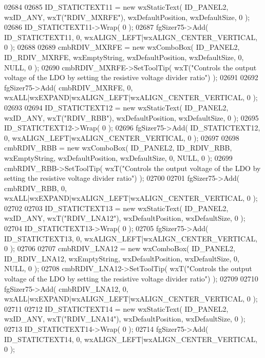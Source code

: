\begin{DoxyCode}
02684     
02685     ID_STATICTEXT11 = \textcolor{keyword}{new} wxStaticText( ID_PANEL2, wxID\_ANY, wxT(\textcolor{stringliteral}{"RDIV\_MXRFE"}), wxDefaultPosition, 
      wxDefaultSize, 0 );
02686     ID_STATICTEXT11->Wrap( 0 );
02687     fgSizer75->Add( ID_STATICTEXT11, 0, wxALIGN\_LEFT|wxALIGN\_CENTER\_VERTICAL, 0 );
02688     
02689     cmbRDIV_MXRFE = \textcolor{keyword}{new} wxComboBox( ID_PANEL2, ID_RDIV_MXRFE, wxEmptyString, wxDefaultPosition, 
      wxDefaultSize, 0, NULL, 0 ); 
02690     cmbRDIV_MXRFE->SetToolTip( wxT(\textcolor{stringliteral}{"Controls the output voltage of the LDO by setting the resistive voltage
       divider ratio"}) );
02691     
02692     fgSizer75->Add( cmbRDIV_MXRFE, 0, wxALL|wxEXPAND|wxALIGN\_LEFT|wxALIGN\_CENTER\_VERTICAL, 0 );
02693     
02694     ID_STATICTEXT12 = \textcolor{keyword}{new} wxStaticText( ID_PANEL2, wxID\_ANY, wxT(\textcolor{stringliteral}{"RDIV\_RBB"}), wxDefaultPosition, 
      wxDefaultSize, 0 );
02695     ID_STATICTEXT12->Wrap( 0 );
02696     fgSizer75->Add( ID_STATICTEXT12, 0, wxALIGN\_LEFT|wxALIGN\_CENTER\_VERTICAL, 0 );
02697     
02698     cmbRDIV_RBB = \textcolor{keyword}{new} wxComboBox( ID_PANEL2, ID_RDIV_RBB, wxEmptyString, wxDefaultPosition, wxDefaultSize, 
      0, NULL, 0 ); 
02699     cmbRDIV_RBB->SetToolTip( wxT(\textcolor{stringliteral}{"Controls the output voltage of the LDO by setting the resistive voltage
       divider ratio"}) );
02700     
02701     fgSizer75->Add( cmbRDIV_RBB, 0, wxALL|wxEXPAND|wxALIGN\_LEFT|wxALIGN\_CENTER\_VERTICAL, 0 );
02702     
02703     ID_STATICTEXT13 = \textcolor{keyword}{new} wxStaticText( ID_PANEL2, wxID\_ANY, wxT(\textcolor{stringliteral}{"RDIV\_LNA12"}), wxDefaultPosition, 
      wxDefaultSize, 0 );
02704     ID_STATICTEXT13->Wrap( 0 );
02705     fgSizer75->Add( ID_STATICTEXT13, 0, wxALIGN\_LEFT|wxALIGN\_CENTER\_VERTICAL, 0 );
02706     
02707     cmbRDIV_LNA12 = \textcolor{keyword}{new} wxComboBox( ID_PANEL2, ID_RDIV_LNA12, wxEmptyString, wxDefaultPosition, 
      wxDefaultSize, 0, NULL, 0 ); 
02708     cmbRDIV_LNA12->SetToolTip( wxT(\textcolor{stringliteral}{"Controls the output voltage of the LDO by setting the resistive voltage
       divider ratio"}) );
02709     
02710     fgSizer75->Add( cmbRDIV_LNA12, 0, wxALL|wxEXPAND|wxALIGN\_LEFT|wxALIGN\_CENTER\_VERTICAL, 0 );
02711     
02712     ID_STATICTEXT14 = \textcolor{keyword}{new} wxStaticText( ID_PANEL2, wxID\_ANY, wxT(\textcolor{stringliteral}{"RDIV\_LNA14"}), wxDefaultPosition, 
      wxDefaultSize, 0 );
02713     ID_STATICTEXT14->Wrap( 0 );
02714     fgSizer75->Add( ID_STATICTEXT14, 0, wxALIGN\_LEFT|wxALIGN\_CENTER\_VERTICAL, 0 );

\end{DoxyCode}
